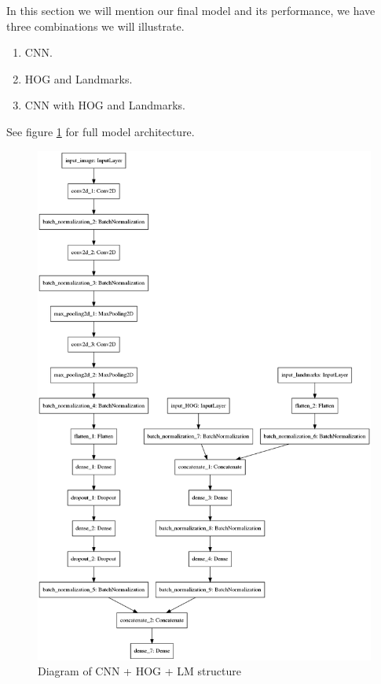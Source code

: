 In this section we will mention our final model and its performance, we have three combinations we will illustrate.

\begin{enumerate}
	\item CNN.
	\item HOG and Landmarks.
	\item CNN with HOG and Landmarks.
\end{enumerate}
See figure \ref{cnn_lm_hog} for full model architecture.
\begin{figure}
	\centering
	\includegraphics[width=1\textwidth]{images/cnn_hog_lm.png}
	\caption{Diagram of CNN + HOG + LM structure}
	\label{cnn_lm_hog}
\end{figure}

